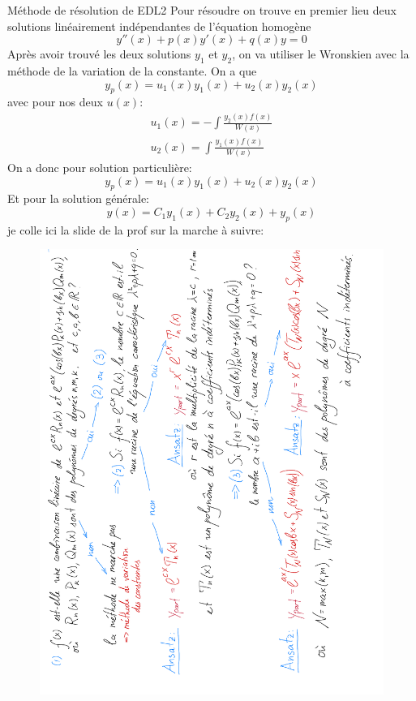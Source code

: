 \begin{parag}{Méthode de résolution de EDL2}
    Pour résoudre on trouve en premier lieu deux solutions linéairement indépendantes de l'équation homogène
    \begin{equation*}  y''\left(x\right) + p\left(x\right)y'\left(x\right) + q\left(x\right)y = 0 \end{equation*}
    Après avoir trouvé les deux solutions $y_1$ et $y_2$, on va utiliser le Wronskien avec la méthode de la variation de la constante.
    On a que 
    \begin{equation*} y_p\left(x\right) = u_1\left(x\right)y_1\left(x\right) + u_2\left(x\right)y_2\left(x\right) \end{equation*}
    avec pour nos deux $u\left(x\right)$:
   \begin{align*} u_1\left(x\right) = - \int\frac{y_2\left(x\right)f\left(x\right)}{W\left(x\right)}\\
   u_2\left(x\right) = \int \frac{y_1\left(x\right)f\left(x\right)}{W\left(x\right)}\end{align*} 
   On a donc pour solution particulière:
   \begin{equation*} y_p\left(x\right) = u_1\left(x\right)y_1\left(x\right) + u_2\left(x\right)y_2\left(x\right) \end{equation*}
   Et pour la solution générale:
   \begin{equation*} y\left(x\right) = C_1y_1\left(x\right) + C_2y_2\left(x\right) + y_p\left(x\right) \end{equation*}
    je colle ici la slide de la prof sur la marche à suivre:
    \begin{figure}[h!]
       \centering 
    \includegraphics[angle=270, scale=0.6]{resuméEDL2.pdf}

\end{figure}
\end{parag}
